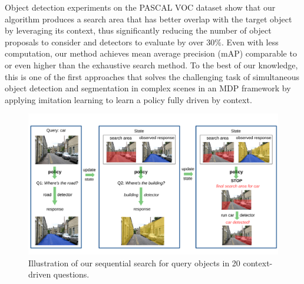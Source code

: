 Object detection experiments on the PASCAL VOC dataset show that our algorithm produces a search area that has better overlap with the target object by leveraging its context, 
thus significantly reducing the number of object proposals to consider and detectors to evaluate by over $30\%$.
Even with less computation, our method achieves mean average precision (mAP) comparable to or even higher than the exhaustive search method. 
To the best of our knowledge, this is one of the first approaches that solves the challenging task of simultaneous object detection and segmentation in complex scenes in an MDP framework by applying imitation learning to learn a policy fully driven by context.


\begin{figure}[!tb]
\begin{center}
\includegraphics[width=\linewidth]{figures/iccv20q-overview.pdf}
\vspace{-1em}
\caption{Illustration of our sequential search for query objects in 20 context-driven questions.}
\label{fig:20Qintro}
\end{center}\vspace{-2em}
\end{figure}





